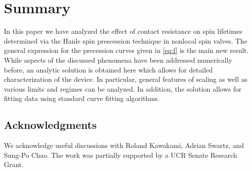 \section{Summary}
\label{s:summary}

In this paper we have analyzed the effect of contact resistance
on spin lifetimes determined via the Hanle spin prescession technique
in nonlocal spin valves.
The general expression for the precession curves given
in \cref{eq:f} is the main new result.
While aspects of the discussed phenomena have been addressed numerically before,
an analytic solution is obtained here
which allows for detailed characterization of the device.
In particular, general features of scaling
as well as various limits and regimes can be analyzed.
In addition, the solution allows for fitting data
using standard curve fitting algorithms.

\subsection{Acknowledgments}

We acknowledge useful discussions with
Roland Kawakami, Adrian Swartz, and Sung-Po Chao.
The work was partially supported by a UCR Senate Research Grant.
